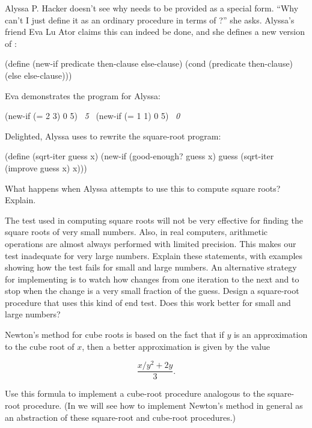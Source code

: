 \begin{exerciseGroup}
\label{Exercise 1.6}
 Alyssa P. Hacker doesn't see why
 needs to be provided as a special form.  ``Why can't I just define it
as an ordinary procedure in terms of ?'' she asks.  Alyssa's friend
Eva Lu Ator claims this can indeed be done, and she defines a new version of
:

\begin{codeBlock}
(define (new-if predicate then-clause else-clause)
  (cond (predicate then-clause)
        (else else-clause)))
\end{codeBlock}

Eva demonstrates the program for Alyssa:

\begin{codeBlock}
(new-if (= 2 3) 0 5)
~\textit{5}~
(new-if (= 1 1) 0 5)
~\textit{0}~
\end{codeBlock}

Delighted, Alyssa uses  to rewrite the square-root program:

\begin{codeBlock}
(define (sqrt-iter guess x)
  (new-if (good-enough? guess x)
          guess
          (sqrt-iter (improve guess x) x)))
\end{codeBlock}

What happens when Alyssa attempts to use this to compute square roots?
Explain.

\label{Exercise 1.7}
 The  test used
in computing square roots will not be very effective for finding the square
roots of very small numbers.  Also, in real computers, arithmetic operations
are almost always performed with limited precision.  This makes our test
inadequate for very large numbers.  Explain these statements, with examples
showing how the test fails for small and large numbers.  An alternative
strategy for implementing  is to watch how 
changes from one iteration to the next and to stop when the change is a very
small fraction of the guess.  Design a square-root procedure that uses this
kind of end test.  Does this work better for small and large numbers?

\label{Exercise 1.8}
 Newton's method for cube roots is
based on the fact that if \( y \) is an approximation to the cube root of \( x \),
then a better approximation is given by the value

$$\frac{{x / y^2} + 2y}{3}.$$

\noindent
Use this formula to implement a cube-root procedure analogous to the
square-root procedure.  (In  we will see how to implement
Newton's method in general as an abstraction of these square-root and cube-root
procedures.)
\end{exerciseGroup}

